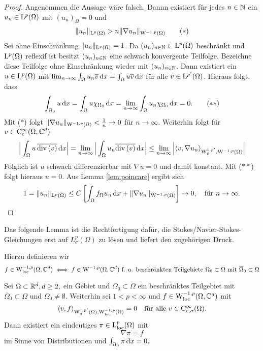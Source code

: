 \begin{proof}
  Angenommen die Aussage wäre falsch.
  Dannn existiert für jedes $n \in \mathbb{N}$ ein $u_n \in \mathrm{L}^p(\Omega)$ mit $(u_n)_\Omega = 0$ und
  \begin{align*}
    \|u_n\|_{\mathrm{L}^p(\Omega)} > n \|\nabla u_n \|_{\mathrm{W}^{-1,p}(\Omega)} \tag{$\ast$}
  \end{align*}
  Sei ohne Einschränkung $\|u_n\|_{\mathrm{L}^p(\Omega)} = 1$.
  Da $(u_n)_{n \in \mathbb{N}} \subset \mathrm{L}^p(\Omega)$ beschränkt und $\mathrm{L}^p(\Omega)$ reflexif ist besitzt $(u_n)_{n \in \mathbb{N}}$ eine schwach konvergente Teilfolge.
  Bezeichne diese Teilfolge ohne Einschränkung wieder mit $(u_n)_{n \in \mathbb{N}}$.
  Dann existiert ein $u \in \mathrm{L}^p(\Omega)$ mit $\lim_{n \to \infty} \int_\Omega u_n \overline v \, {\operatorname{d}\!{x}} = \int_\Omega u \overline v \, {\operatorname{d}\!{x}}$ für alle $v \in \mathrm{L}^{p'}(\Omega)$.
  Hieraus folgt, dass
  \begin{align*}
  \int_{\Omega_0} u \, {\operatorname{d}\!{x}} 
  = \int_\Omega u \chi_{\Omega_0} \, {\operatorname{d}\!{x}}
  = \lim_{n \to \infty} \int_\Omega u_n \chi_{\Omega_0} \, {\operatorname{d}\!{x}} = 0. \tag{$\ast\ast$}
  \end{align*}
  Mit ($\ast$) folgt $\|\nabla u_n\|_{\mathrm{W}^{-1,p}(\Omega)} < \frac{1}{n} \to 0$ für $n \to \infty$.
  Weiterhin folgt für $v \in \mathrm{C}_{\mathrm{c}}^\infty(\Omega,\mathbb{C}^d)$
  $$
  \Big| \int_\Omega u \, \overline{\mathrm{div\,} (v)} \, {\operatorname{d}\!{x}} \Big|
  = \lim_{n \to \infty} \Big| \int_\Omega u_n \overline{\mathrm{div\,} (v)} \, {\operatorname{d}\!{x}} \Big|
  \leq \lim_{n \to \infty} \Big| \langle v, \nabla u_n \rangle_{\mathrm{W}_0^{1,p'}, \mathrm{W}^{-1,p}(\Omega)} \Big|
  $$
  Folglich ist $u$ schwach differenzierbar mit $\nabla u = 0$ und damit konstant.
  Mit ($\ast\ast$) folgt hieraus $u = 0$.
  Aus Lemma \ref{lem:poincare} ergibt sich
  $$
  1 = \|u_n\|_{\mathrm{L}^p(\Omega)}
  \leq C \left[ \int_\Omega f_\Omega u_n \, {\operatorname{d}\!{x}} + \|\nabla u_n\|_{\mathrm{W}^{-1,p}(\Omega)} \right] \to 0, \quad\text{für } n \to \infty.
  $$
\end{proof}

Das folgende Lemma ist die Rechtfertigung dafür, die Stokes/Navier-Stokes-Gleichungen erst auf $L_\sigma^p(\Omega)$ zu lösen und liefert den zugehörigen Druck.

Hierzu definieren wir
$$
f \in \mathrm{W}_{\operatorname{loc}}^{-1,p}(\Omega, \mathbb{C}^d) \iff f \in \mathrm{W}^{-1,p}(\Omega, \mathbb{C}^d) \text{ f. a. beschränkten Teilgebiete } \Omega_0 \subset \Omega \text{ mit } \overline\Omega_0 \subset \Omega
$$

\begin{lem}
  \label{lem:pressureGrad}
  Sei $\Omega \subset \mathbb{R}^d, d \geq 2,$ ein Gebiet und $\Omega_0 \subset \Omega$ ein beschränktes Teilgebiet mit $\overline\Omega_0 \subset \Omega$ und $\Omega_0 \neq \emptyset$.
  Weiterhin sei $1 < p < \infty$ und $f \in \mathrm{W}_{\operatorname{loc}}^{-1,p}(\Omega, \mathbb{C}^d)$ mit
  $$
  \langle v , f \rangle_{\mathrm{W}_0^{1,p'}(\Omega), \mathrm{W}_{\operatorname{loc}}^{-1,p}(\Omega)} = 0 \quad\text{für alle } v \in \mathrm{C}_{\mathrm{c},\sigma}^\infty(\Omega).
  $$
  Dann existiert ein eindeutiges $\pi \in \mathrm{L}^p_{\operatorname{loc}}(\Omega)$ mit
  $$
  \nabla \pi = f
  $$
  im Sinne von Distributionen und $\int_{\Omega_0} \pi \, {\operatorname{d}\!{x}} = 0$.
\end{lem}

